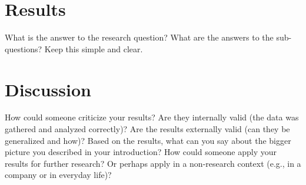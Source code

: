 \documentclass[a4paper]{article}
\begin{document}
\section{Results}
What is the answer to the research question? What are the answers to the sub-questions? Keep this simple and clear.

\section{Discussion}
How could someone criticize your results? Are they internally valid (the data was gathered and analyzed correctly)? Are the results externally valid (can they be generalized and how)? Based on the results, what can you say about the bigger picture you described in your introduction? How could someone apply your results for further research? Or perhaps apply in a non-research context (e.g., in a company or in everyday life)?

\begin{comment}
KEEP IN MIND!
* A thesis is never read from the beginning to the end in a linear way: write each chapter as a “stand-alone”. 
* Make sure your research question, method, and results form a super clear and clean package: this is the question, this is what I did to find an answer, this is the answer. Your Mom should understand it.
* You will spend most of your sweat in the literature review.
* Choose an audience. Your professor is the most important (and perhaps the only) person who will read the thesis, but have also a wider audience in mind (e.g., colleagues, other professionals).
\end{comment}

\end{document}
